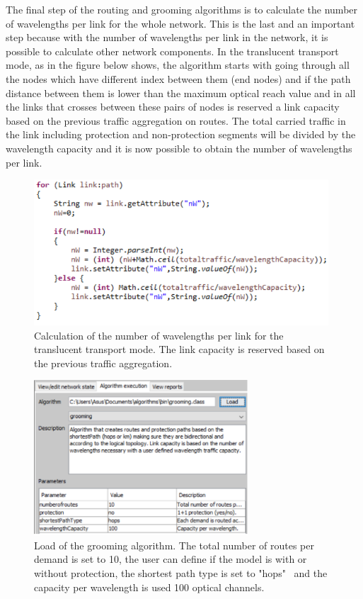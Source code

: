 \vspace{11pt}
The final step of the routing and grooming algorithms is to calculate the number of wavelengths per link for the whole network. This is the last and an important step because with the number of wavelengths per link in the network, it is possible to calculate other network components. In the translucent transport mode, as in the figure below shows, the algorithm starts with going through all the nodes which have different index between them (end nodes) and if the path distance between them is lower than the maximum optical reach value and in all the links that crosses between these pairs of nodes is reserved a link capacity based on the previous traffic aggregation on routes. The total carried traffic in the link including protection and non-protection segments will be divided by the wavelength capacity and it is now possible to obtain the number of wavelengths per link.

\begin{figure}[H]
\centering
\includegraphics[width=11cm]{sdf/heuristic/translucent_survivability/figures/grooming_translucent_surv3}
\caption{Calculation of the number of wavelengths per link for the translucent transport mode. The link capacity is reserved based on the previous traffic aggregation.}
\label{grooming_translucent_surv3}
\end{figure}

\begin{figure}[H]
\centering
\includegraphics[width=8cm]{sdf/heuristic/translucent_survivability/figures/grooming_translucent_surv4}
\caption{Load of the grooming algorithm. The total number of routes per demand is set to 10, the user can define if the model is with or without protection, the shortest path type is set to "hops" \ and the capacity per wavelength is used 100 optical channels.}
\label{grooming_translucent_surv4}
\end{figure}

